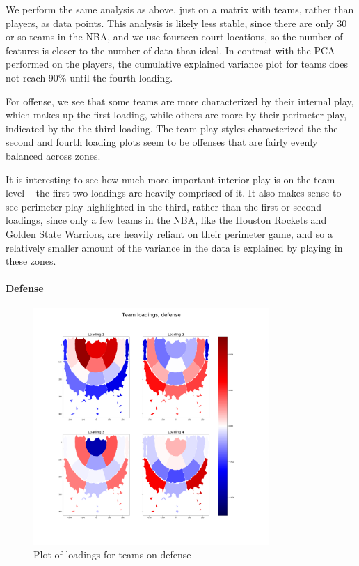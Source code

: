 \documentclass[]{article}
\let\oldparagraph\paragraph
\renewcommand{\paragraph}[1]{\oldparagraph{#1}\mbox{}}
\begin{document}
We perform the same analysis as above, just on a matrix with teams,
rather than players, as data points. This analysis is likely less
stable, since there are only 30 or so teams in the NBA, and we use
fourteen court locations, so the number of features is closer to the
number of data than ideal. In contrast with the PCA performed on the
players, the cumulative explained variance plot for teams does not reach
90\% until the fourth loading.

For offense, we see that some teams are more characterized by their
internal play, which makes up the first loading, while others are more
by their perimeter play, indicated by the the third loading. The team
play styles characterized the the second and fourth loading plots seem
to be offenses that are fairly evenly balanced across zones.

It is interesting to see how much more important interior play is on the
team level -- the first two loadings are heavily comprised of it. It
also makes sense to see perimeter play highlighted in the third, rather
than the first or second loadings, since only a few teams in the NBA,
like the Houston Rockets and Golden State Warriors, are heavily reliant
on their perimeter game, and so a relatively smaller amount of the
variance in the data is explained by playing in these zones.

\hypertarget{defense-1}{%
\paragraph{Defense}\label{defense-1}}

\begin{figure}
\centering
\includegraphics[width=0.8\textwidth,height=\textheight]{first_4_loadings_teams_def.png}
\caption{Plot of loadings for teams on defense}
\end{figure}
\end{document}
